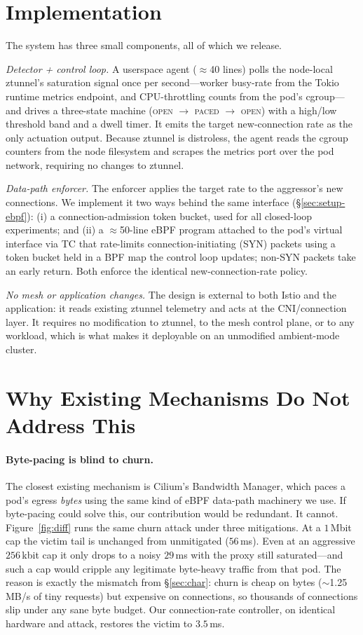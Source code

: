 \documentclass[10pt,twocolumn]{article}
\begin{document}
\section{Implementation}
\label{sec:impl}
The system has three small components, all of which we release.

\emph{Detector + control loop.} A userspace agent ($\approx$40 lines) polls the node-local
ztunnel's saturation signal once per second---worker busy-rate from the Tokio runtime
metrics endpoint, and CPU-throttling counts from the pod's cgroup---and drives a
three-state machine (\textsc{open} $\to$ \textsc{paced} $\to$ \textsc{open}) with a high/low
threshold band and a dwell timer. It emits the target new-connection rate as the only
actuation output. Because ztunnel is distroless, the agent reads the cgroup counters from
the node filesystem and scrapes the metrics port over the pod network, requiring no changes
to ztunnel.

\emph{Data-path enforcer.} The enforcer applies the target rate to the aggressor's
new connections. We implement it two ways behind the same interface (\S\ref{sec:setup-ebpf}):
(i) a connection-admission token bucket, used for all closed-loop experiments; and (ii) a
$\approx$50-line eBPF program attached to the pod's virtual interface via TC that
rate-limits connection-initiating (SYN) packets using a token bucket held in a BPF map the
control loop updates; non-SYN packets take an early return. Both enforce the identical
new-connection-rate policy.

\emph{No mesh or application changes.} The design is external to both Istio and the
application: it reads existing ztunnel telemetry and acts at the CNI/connection layer. It
requires no modification to ztunnel, to the mesh control plane, or to any workload, which
is what makes it deployable on an unmodified ambient-mode cluster.

\section{Why Existing Mechanisms Do Not Address This}
\label{sec:diff}
\paragraph{Byte-pacing is blind to churn.} The closest existing mechanism is Cilium's
Bandwidth Manager, which paces a pod's egress \emph{bytes} using the same kind of eBPF
data-path machinery we use. If byte-pacing could solve this, our contribution would be
redundant. It cannot. Figure~\ref{fig:diff} runs the same churn attack under three
mitigations. At a $1\,$Mbit cap the victim tail is unchanged from unmitigated
($56\,$ms). Even at an aggressive $256\,$kbit cap it only drops to a noisy $29\,$ms with
the proxy still saturated---and such a cap would cripple any legitimate byte-heavy
traffic from that pod. The reason is exactly the mismatch from \S\ref{sec:char}: churn is
cheap on bytes ($\sim$1.25\,MB/s of tiny requests) but expensive on connections, so
thousands of connections slip under any sane byte budget. Our connection-rate controller,
on identical hardware and attack, restores the victim to $3.5\,$ms.
\end{document}
